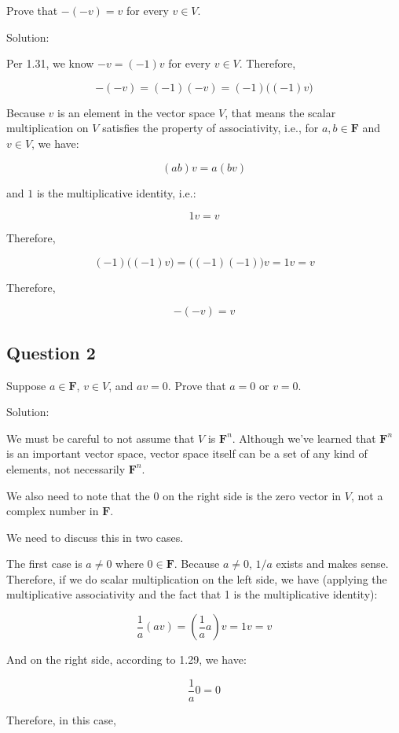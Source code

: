 \documentclass[12pt, letterpaper, oneside]{book}
\begin{document}
Prove that $-(-v) = v$ for every $v \in V$.

Solution:

Per 1.31, we know $-v = (-1)v$ for every $v \in V$. Therefore,

\[ -(-v) = (-1)(-v) = (-1)\bigl((-1)v\bigr) \]

Because $v$ is an element in the vector space $V$, that means the scalar
multiplication on $V$ satisfies the property of associativity, i.e., for $a, b
  \in \mathbf{F}$ and $v \in V$, we have:

\[ (ab)v = a(bv)\]

and $1$ is the multiplicative identity, i.e.:

\[ 1v = v\]

Therefore,

\[ (-1)\bigl((-1)v\bigr) = \bigl((-1)(-1)\bigr)v = 1v = v \]

Therefore,

\[ -(-v) = v \]

\subsection{Question 2}

Suppose $a \in \mathbf{F}$, $v \in V$, and $av = 0$. Prove that $a = 0$ or
$v = 0$.

Solution:

We must be careful to not assume that $V$ is $\mathbf{F}^n$. Although we've
learned that $\mathbf{F}^n$ is an important vector space, vector space itself
can be a set of any kind of elements, not necessarily $\mathbf{F}^n$.

We also need to note that the $0$ on the right side is the zero vector in $V$,
not a complex number in $\mathbf{F}$.

We need to discuss this in two cases.

The first case is $a \neq 0$ where $0 \in \mathbf{F}$. Because $a \neq 0$,
$1/a$ exists and makes sense. Therefore, if we do scalar multiplication on the
left side, we have (applying the multiplicative associativity and the fact that
1 is the multiplicative identity):

\[ \frac{1}{a}(av) = (\frac{1}{a}a)v = 1v = v \]

And on the right side, according to 1.29, we have:

\[ \frac{1}{a}0 = 0 \]

Therefore, in this case,
\end{document}
